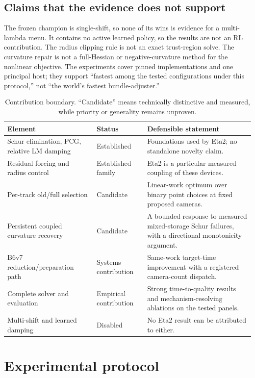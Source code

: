 \documentclass[10pt]{article}
\begin{document}
\subsection{Claims that the evidence does not support}

The frozen champion is single-shift, so none of its wins is evidence for a multi-lambda menu.  It contains no active learned policy, so the results are not an RL contribution.  The radius clipping rule is not an exact trust-region solve.  The curvature repair is not a full-Hessian or negative-curvature method for the nonlinear objective.  The experiments cover pinned implementations and one principal host; they support ``fastest among the tested configurations under this protocol,'' not ``the world's fastest bundle-adjuster.''

\begin{table}[t]
\centering
\small
\caption{Contribution boundary.  ``Candidate'' means technically distinctive and measured, while priority or generality remains unproven.}
\begin{tabularx}{\textwidth}{@{}L{0.25\textwidth}L{0.29\textwidth}Y@{}}
\toprule
Element & Status & Defensible statement\\
\midrule
Schur elimination, PCG, relative LM damping & Established & Foundations used by Eta2; no standalone novelty claim.\\
Residual forcing and radius control & Established family & Eta2 is a particular measured coupling of these devices.\\
Per-track old/full selection & Candidate & Linear-work optimum over binary point choices at fixed proposed cameras.\\
Persistent coupled curvature recovery & Candidate & A bounded response to measured mixed-storage Schur failures, with a directional monotonicity argument.\\
B6v7 reduction/preparation path & Systems contribution & Same-work target-time improvement with a registered camera-count dispatch.\\
Complete solver and evaluation & Empirical contribution & Strong time-to-quality results and mechanism-resolving ablations on the tested panels.\\
Multi-shift and learned damping & Disabled & No Eta2 result can be attributed to either.\\
\bottomrule
\end{tabularx}
\end{table}

\section{Experimental protocol}
\end{document}
